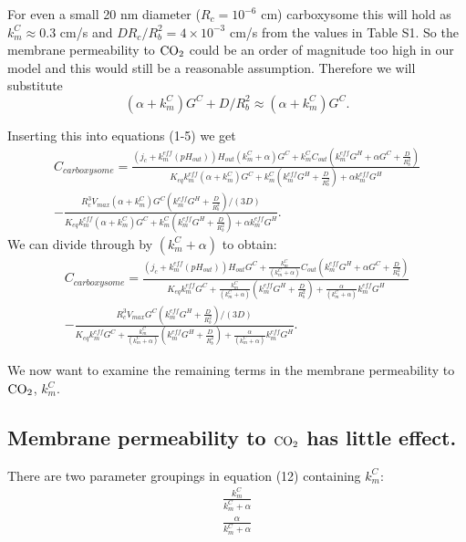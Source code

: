 \documentclass[]{article}
\begin{document}
For even a small 20 nm diameter ($R_c = 10^{-6}$ cm) carboxysome this will hold as $k_m^C \approx 0.3 $ cm/s and $D R_c/R_b^2 = 4 \times 10^{-3}$ cm/s from the values in Table S1. So the membrane permeability to ${\rm CO_2}$ could be an order of magnitude too high in our model and this would still be a reasonable assumption. Therefore we will substitute 
\begin{equation}
(\alpha + k_m^C)G^C + D/R_b^2 \approx (\alpha + k_m^C)G^C.
\end{equation}

Inserting this into equations (1-5) we get
\begin{multline}
C_{carboxysome} = \frac{(j_c+k_m^{eff}(pH_{out}))H_{out}(k_m^C+\alpha)G^C 
	+ k_m^C C_{out} (k_m^{eff} G^H +\alpha G^C+\frac{D}{R_b^2})}
{K_{eq} k_m^{eff}(\alpha+ k_m^C)G^C 
	 + k_m^C\left(k_m^{eff} G^H + \frac{D}{R_b^2}\right) + \alpha k_m^{eff} G^H} \\
-\frac{R_c^3 V_{max}(\alpha + k_m^C)G^C(k_m^{eff} G^H + \frac{D}{R_b^2})/(3D)}
{ K_{eq} k_m^{eff} \left(\alpha+ k_m^C \right)G^C 
	+ k_m^C\left(k_m^{eff} G^H + \frac{D}{R_b^2}\right) + \alpha k_m^{eff} G^H}.
\end{multline}
We can divide through by  $(k_m^C+\alpha)$ to obtain:
\begin{multline}
	C_{carboxysome} = \frac{(j_c+k_m^{eff}(pH_{out}))H_{out}G^C + \frac{k_m^C}{(k_m^C+\alpha)} C_{out} (k_m^{eff} G^H +\alpha G^C+\frac{D}{R_b^2})}
	{K_{eq} k_m^{eff} G^C  
		+\frac{k_m^C}{(k_m^C+\alpha)} \left(k_m^{eff} G^H + \frac{D}{R_b^2}\right) 
		+ \frac{\alpha}{(k_m^C+\alpha)}  k_m^{eff} G^H} \\
	-\frac{R_c^3 V_{max}G^C(k_m^{eff} G^H + \frac{D}{R_b^2})/(3D)}
	{ K_{eq} k_m^{eff} G^C + \frac{k_m^C}{(k_m^C+\alpha)}\left(k_m^{eff} G^H + \frac{D}{R_b^2}\right) 
		+ \frac{\alpha}{(k_m^C+\alpha)} k_m^{eff} G^H}.
\end{multline}

We now want to examine the remaining terms in the membrane permeability to ${\rm CO_2}$, $k_m^C$.

\subsection{Membrane permeability to ${\rm CO_2}$ has little effect.}
There are two parameter groupings in equation (12) containing $k_m^C$:
\begin{eqnarray}
\frac{k_m^C}{k_m^C + \alpha}\\
\frac{\alpha}{k_m^C + \alpha}
\end{eqnarray}
\end{document}
